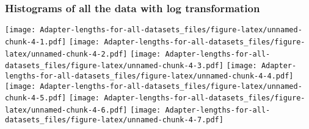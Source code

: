 \documentclass[
]{article}
\newenvironment{Shaded}{\begin{snugshade}}{\end{snugshade}}
\newcommand{\AttributeTok}[1]{\textcolor[rgb]{0.13,0.29,0.53}{#1}}
\newcommand{\CommentTok}[1]{\textcolor[rgb]{0.56,0.35,0.01}{\textit{#1}}}
\newcommand{\ConstantTok}[1]{\textcolor[rgb]{0.56,0.35,0.01}{#1}}
\newcommand{\ControlFlowTok}[1]{\textcolor[rgb]{0.13,0.29,0.53}{\textbf{#1}}}
\newcommand{\DecValTok}[1]{\textcolor[rgb]{0.00,0.00,0.81}{#1}}
\newcommand{\FunctionTok}[1]{\textcolor[rgb]{0.13,0.29,0.53}{\textbf{#1}}}
\newcommand{\NormalTok}[1]{#1}
\newcommand{\OtherTok}[1]{\textcolor[rgb]{0.56,0.35,0.01}{#1}}
\newcommand{\SpecialCharTok}[1]{\textcolor[rgb]{0.81,0.36,0.00}{\textbf{#1}}}
\newcommand{\StringTok}[1]{\textcolor[rgb]{0.31,0.60,0.02}{#1}}
\begin{document}
\subsubsection{Histograms of all the data with log
transformation}\label{histograms-of-all-the-data-with-log-transformation}

\begin{Shaded}
\end{Shaded}

\texttt{[image: Adapter-lengths-for-all-datasets\_files/figure-latex/unnamed-chunk-4-1.pdf]}
\texttt{[image: Adapter-lengths-for-all-datasets\_files/figure-latex/unnamed-chunk-4-2.pdf]}
\texttt{[image: Adapter-lengths-for-all-datasets\_files/figure-latex/unnamed-chunk-4-3.pdf]}
\texttt{[image: Adapter-lengths-for-all-datasets\_files/figure-latex/unnamed-chunk-4-4.pdf]}
\texttt{[image: Adapter-lengths-for-all-datasets\_files/figure-latex/unnamed-chunk-4-5.pdf]}
\texttt{[image: Adapter-lengths-for-all-datasets\_files/figure-latex/unnamed-chunk-4-6.pdf]}
\texttt{[image: Adapter-lengths-for-all-datasets\_files/figure-latex/unnamed-chunk-4-7.pdf]}
\end{document}
